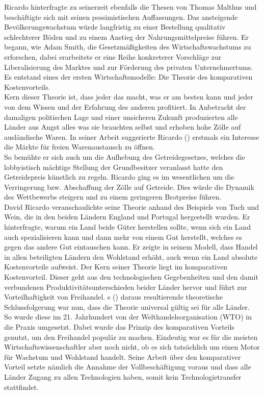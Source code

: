 Ricardo hinterfragte zu seinerzeit ebenfalls die Thesen von Thomas Malthus und beschäftigte sich mit seinen pessimistischen Auffassungen. Das ansteigende Bevölkerungswachstum würde langfristig zu einer Bestellung qualitativ schlechterer Böden und zu einem Anstieg der Nahrungsmittelpreise führen. Er begann, wie Adam Smith, die Gesetzmäßigkeiten des Wirtschaftswachstums zu erforschen, dabei erarbeitete er eine Reihe konkreterer Vorschläge zur Liberalisierung des Marktes und zur Förderung des privaten Unternehmertums. Es entstand eines der ersten Wirtschaftsmodelle: Die Theorie des komparativen Kostenvorteils.\\
%
  Kern dieser Theorie ist, dass jeder das macht, was er am besten kann und jeder von dem Wissen und der Erfahrung des anderen profitiert. In Anbetracht der damaligen politischen Lage und einer unsicheren Zukunft produzierten alle Länder aus Angst alles was sie brauchten selbst und erhoben hohe Zölle auf ausländische Waren. In seiner Arbeit suggerierte Ricardo (\citeyear{Ricardo.1817}) erstmals ein Interesse die Märkte für freien Warenaustausch zu öffnen.\\
%
 So bemühte er sich auch um die Aufhebung des Getreidegesetzes, welches die lobbyistisch mächtige Stellung der Grundbesitzer veranlasst hatte den Getreidepreis künstlich zu regeln. Ricardo ging es im wesentlichen um die Verringerung bzw. Abschaffung der Zölle auf Getreide. Dies würde die Dynamik des Wettbewerbs steigern und zu einem geringeren Brotpreise führen. \\
%
 David Ricardo veranschaulichte seine Theorie anhand des Beispiels von Tuch und Wein, die in den beiden Ländern England und Portugal hergestellt wurden. Er hinterfragte, warum ein Land beide Güter herstellen sollte, wenn sich ein Land auch spezialisieren kann und dann mehr von einem Gut herstellt, welches es gegen das andere Gut eintauschen kann. Er zeigte in seinem Modell, dass Handel in allen beteiligten Ländern den Wohlstand erhöht, auch wenn ein Land absolute Kostenvorteile aufweist. Der Kern seiner Theorie liegt im komparativen Kostenvorteil. Dieser geht aus den technologischen Gegebenheiten und den damit verbundenen Produktivitätsunterschieden beider Länder hervor und führt zur Vorteilhaftigkeit von Freihandel. \cite{Ricardo.1817}s (\citeyear{Ricardo.1817}) daraus resultierende theoretische Schlussfolgerung war nun, dass die Theorie universal gültig sei für alle Länder.\\
%
 So wurde diese im 21. Jahrhundert von der Welthandelsorganisation (WTO) in die Praxis umgesetzt. Dabei wurde das Prinzip des komparativen Vorteils genutzt, um den Freihandel populär zu machen. Eindeutig war es für die meisten Wirtschaftswissenschaftler aber noch nicht, ob es sich tatsächlich um einen Motor für Wachstum und Wohlstand handelt. Seine Arbeit über den komparativer Vorteil setzte nämlich die Annahme der Vollbeschäftigung voraus und dass alle Länder Zugang zu allen Technologien haben, somit kein Technologietransfer stattfindet. \\
